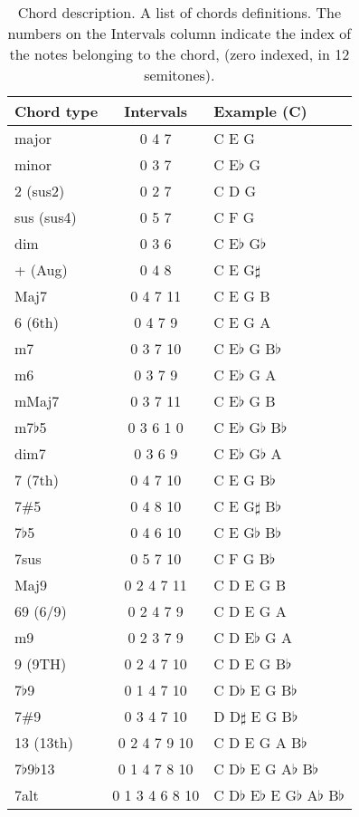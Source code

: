 \begin{table}
\centering
  \caption[Chord description.] {Chord description. A list of chords definitions.  The numbers on the Intervals column indicate the index of the notes belonging to the chord, (zero indexed, in 12 semitones).}
  \label{tab:chord_extensions}
  \begin{tabular}{  l  c  l }
    \hline
    Chord type & Intervals & Example (C) \\ \hline
    major & 0 4 7 & C E G \\
    minor & 0 3 7 & C E$\flat$ G \\
    2 (sus2) & 0 2 7 & C D G \\
	sus (sus4) & 0 5 7 & C F G \\
    dim & 0 3 6 &  C E$\flat$ G$\flat$\\
    + (Aug) & 0 4 8 & C E G$\sharp$ \\
	Maj7 & 0 4 7 11 & C E G B \\
	6 (6th) & 0 4 7 9 & C E G A \\
	m7 & 0 3 7 10 & C E$\flat$ G B$\flat$ \\
	m6 & 0 3 7 9 & C E$\flat$ G A \\
	mMaj7 & 0 3 7 11 & C E$\flat$ G B \\
    m7$\flat$5 & 0 3 6 1 0& C E$\flat$ G$\flat$ B$\flat$ \\
    dim7 & 0 3 6 9 & C E$\flat$ G$\flat$ A \\
	7 (7th) & 0 4 7 10 & C E G B$\flat$ \\
	7\#5 & 0 4 8 10 & C E G$\sharp$ B$\flat$ \\
	7$\flat$5 & 0 4 6 10 & C E G$\flat$ B$\flat$ \\
	7sus & 0 5 7 10 & C F G B$\flat$ \\
	Maj9 & 0 2 4 7 11 & C D E G B \\
	69 (6/9) & 0 2 4 7 9 & C D E G A \\
	m9 & 0 2 3 7 9 & C D E$\flat$ G A \\
	9 (9TH) & 0 2 4 7 10 & C D E G B$\flat$ \\
	7$\flat$9 & 0 1 4 7 10 & C D$\flat$ E G B$\flat$ \\
	7\#9 & 0 3 4 7 10 & D D$\sharp$ E G B$\flat$ \\
	13 (13th) & 0 2 4 7 9 10 & C D E G A B$\flat$ \\
	7$\flat$9$\flat$13 & 0 1 4 7 8 10 & C D$\flat$ E G A$\flat$ B$\flat$ \\
	7alt & 0 1 3 4 6 8 10 & C D$\flat$ E$\flat$ E G$\flat$ A$\flat$ B$\flat$ \\
    \hline
  \end{tabular}

\end{table}
